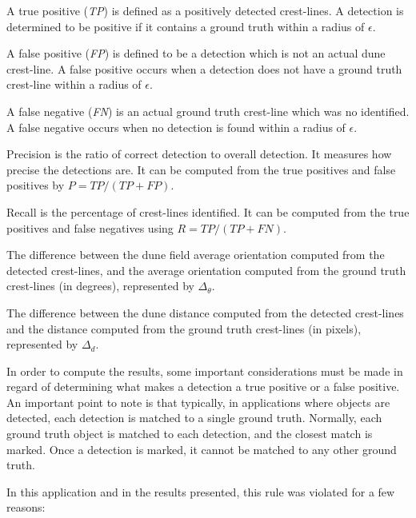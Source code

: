 \begin{description}[align=left]
	\item[True Positives] A true positive (\emph{TP}) is defined as a positively detected crest-lines. A detection is determined to be positive if it contains a ground truth within a radius of $\epsilon$.
	\item[False Positives] A false positive (\emph{FP}) is defined to be a detection which is not an actual dune crest-line. A false positive occurs when a detection does not have a ground truth crest-line within a radius of $\epsilon$.
	\item[False Negative] A false negative (\emph{FN}) is an actual ground truth crest-line which was no identified. A false negative occurs when no detection is found within a radius of $\epsilon$.
	\item[Precision] Precision is the ratio of correct detection to overall detection. It measures how precise the detections are. It can be computed from the true positives and false positives by $P=TP/(TP+FP)$.
	\item[Recall] Recall is the percentage of crest-lines identified. It can be computed from the true positives and false negatives using $R=TP/(TP+FN)$.
	\item[Angular Error] The difference between the dune field average orientation computed from the detected crest-lines, and the average orientation computed from the ground truth crest-lines (in degrees), represented by $\Delta_{\theta}$.
	\item[Inter-Dune Distance Error] The difference between the dune distance computed from the detected crest-lines and the distance computed from the ground truth crest-lines (in pixels), represented by $\Delta_{d}$.
\end{description}

In order to compute the results, some important considerations must be made in regard of determining what makes a detection a true positive or a false positive. An important point to note is that typically, in applications where objects are detected, each detection is matched to a single ground truth. Normally, each ground truth object is matched to each detection, and the closest match is marked. Once a detection is marked, it cannot be matched to any other ground truth.

In this application and in the results presented, this rule was violated for a few reasons:

